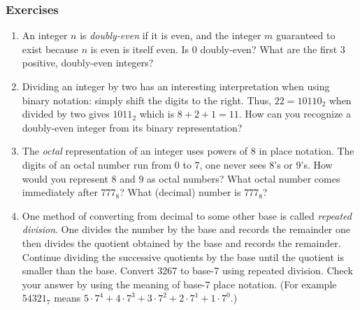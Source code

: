 \documentclass[10pt,]{book}
\theoremstyle{plain}
\theoremstyle{definition}
\theoremstyle{definition}
\numberwithin{equation}{section}
\newcommand{\hint}[1]{ }
\begin{document}
\subsubsection[{Exercises}]{Exercises}\label{exercises-4}
\leavevmode%
\begin{enumerate}[label=(\alph*)]
\item\hypertarget{li-47}{}
          An integer \(n\) is  \emph{doubly-even} 
          if it is even, and the integer \(m\) guaranteed to exist because 
          \(n\) is even is itself even.  Is 0 doubly-even?  What are the 
          first 3 positive, doubly-even integers?



          \hint{Answers: yes, 0,4 and 8.}
\item\hypertarget{li-48}{}
          Dividing an integer by two has an interesting interpretation
          when using binary notation: simply shift the digits to the right.
          Thus, \(22 = 10110_2\) when divided by two gives \(1011_2\) which is
          \(8+2+1=11\).  How can you recognize a doubly-even integer from
          its binary representation?



          \hint{Even numbers have a zero in their units place. What digit must also be zero in a doubly-even number's binary representation?}
\item\hypertarget{li-49}{}
          The  \emph{octal} representation 
          of an integer uses powers of 8 in place notation.  The digits of an 
          octal number run from 0 to 7, one never sees 8's or 9's.  How would 
          you represent 8 and 9 as octal numbers?  What octal number comes 
          immediately after \(777_8\)?  What (decimal) number is \(777_8\)?





          \hint{Eight is \(10_8\), nine is \(11_8\). The point of asking questions about \(777\), is that (in octal) \(7\) is the digit that is analogous to \(9\) in base-\(10\). Thus \(777_8\) is something like \(999_{10}\) in that the number following both of them is written \(1000\) (although \(1000_8\) and \(1000_{10}\) are certainly not equal!)}
\item\hypertarget{li-50}{}
          One method of converting from decimal to some other base is
          called  \emph{repeated division}.  
          One divides the number by the base
          and records the remainder \textemdash{} one then divides the quotient obtained
          by the base and records the remainder.  Continue dividing the 
          successive quotients by the base until the quotient is smaller than
          the base.  Convert 3267 to base-7 using repeated division.  Check 
          your answer by using the meaning of base-7 place notation.  (For
          example \(54321_7\) means \(5\cdot7^4 + 4\cdot7^3 + 3 \cdot7^2 +
          2\cdot7^1 + 1\cdot7^0\).)




\end{enumerate}
\end{document}
